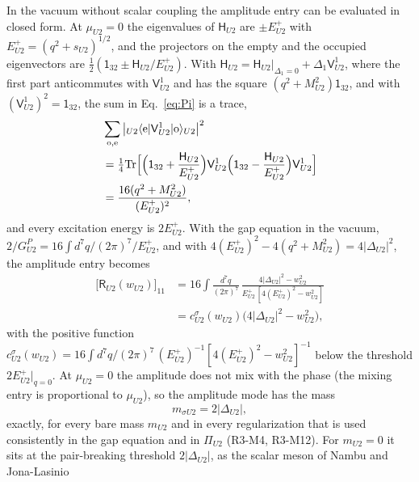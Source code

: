In the vacuum without scalar coupling the amplitude entry can be evaluated in closed form. At
$\mu_{U2}=0$ the eigenvalues of $\mathsf H_{U2}$ are $\pm E^+_{U2}$ with $E^+_{U2}=(q^2+s_{U2})^{1/2}$,
and the projectors on the empty and the occupied eigenvectors are
$\tfrac12(\mathsf 1_{32}\pm\mathsf H_{U2}/E^+_{U2})$. With
$\mathsf H_{U2}=\mathsf H_{U2}|_{\Delta_1=0}+\Delta_1\mathsf V^1_{U2}$, where the first part anticommutes with
$\mathsf V^1_{U2}$ and has the square $(q^2+M^2_{U2})\mathsf 1_{32}$, and with
$(\mathsf V^1_{U2})^2=\mathsf 1_{32}$, the sum in Eq.~\eqref{eq:Pi} is a trace,
\begin{equation}
\begin{aligned}
&\sum_{\rm o,e}\big|{}_{U2}\langle\mathrm e|\mathsf V^1_{U2}|\mathrm o\rangle_{U2}\big|^2\\
&=\tfrac14\mathrm{Tr}\Big[\Big(\mathsf 1_{32}+\frac{\mathsf H_{U2}}{E^+_{U2}}\Big)\mathsf V^1_{U2}\Big(\mathsf 1_{32}-\frac{\mathsf H_{U2}}{E^+_{U2}}\Big)\mathsf V^1_{U2}\Big]\\
&=\frac{16(q^2+M^2_{U2})}{(E^+_{U2})^2},
\end{aligned}
\label{eq:trace}
\end{equation}
and every excitation energy is $2E^+_{U2}$. With the gap equation in the vacuum,
$2/G^P_{U2}=16\int d^7q/(2\pi)^7/E^+_{U2}$, and with
$4(E^+_{U2})^2-4(q^2+M^2_{U2})=4|\Delta_{U2}|^2$, the amplitude entry becomes
\begin{equation}
\begin{aligned}
\big[\mathsf R_{U2}(w_{U2})\big]_{11}&=16\!\int\!\frac{d^7q}{(2\pi)^7}\,
\frac{4|\Delta_{U2}|^2-w^2_{U2}}{E^+_{U2}\,[4(E^+_{U2})^2-w^2_{U2}]}\\
&=c^\sigma_{U2}(w_{U2})\big(4|\Delta_{U2}|^2-w^2_{U2}\big),
\end{aligned}
\label{eq:sigmamass}
\end{equation}
with the positive function $c^\sigma_{U2}(w_{U2})=16\int d^7q/(2\pi)^7\,(E^+_{U2})^{-1}[4(E^+_{U2})^2
-w^2_{U2}]^{-1}$ below the threshold $2E^+_{U2}|_{q=0}$. At $\mu_{U2}=0$ the amplitude does not mix
with the phase (the mixing entry is proportional to $\mu_{U2}$), so the amplitude mode has the mass
\begin{equation}
m_{\sigma U2}=2|\Delta_{U2}|,
\label{eq:msigma}
\end{equation}
exactly, for every bare mass $m_{U2}$ and in every regularization that is used consistently in the
gap equation and in $\Pi_{U2}$ (R3-M4, R3-M12). For $m_{U2}=0$ it
sits at the pair-breaking threshold $2|\Delta_{U2}|$, as the scalar meson of Nambu and Jona-Lasinio
